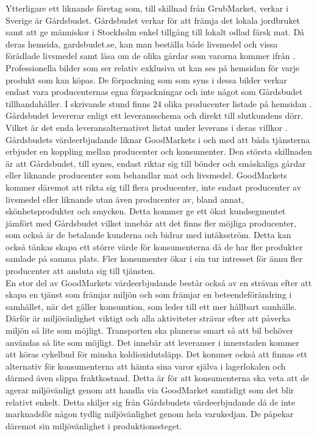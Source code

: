 \documentclass[10pt,a4paper,oneside]{article}
\begin{document}
Ytterligare ett liknande företag som, till skillnad från GrubMarket, verkar i Sverige är Gårdsbudet. Gårdsbudet verkar för att främja det lokala jordbruket samt att ge människor i Stockholm enkel tillgång till lokalt odlad färsk mat. Då deras hemsida, gardsbudet.se, kan man beställa både livsmedel och vissa förädlade livsmedel samt läsa om de olika gårdar som varorna kommer ifrån \cite{Gårdsbudet3}. Professionella bilder som ser relativ exklusiva ut kan ses på hemsidan för varje produkt som kan köpas. De förpackning som som syns i dessa bilder verkar endast vara producenternas egna förpackningar och inte något som Gårdsbudet tillhandahåller. I skrivande stund finns 24 olika producenter listade på hemsidan \cite{Gårdsbudet2}. Gårdsbudet levererar enligt ett leveransschema och direkt till slutkundens dörr. Vilket är det enda leveransalternativet listat under leverans i deras villkor \citep{Gårdsbudet1}. Gårdsbudets värdeerbjudande liknar GoodMarkets i och med att båda tjänsterna erbjuder en koppling mellan producenter och konsumenter. Den största skillnaden är att Gårdsbudet, till synes, endast riktar sig till bönder och småskaliga gårdar eller liknande producenter som behandlar mat och livsmedel. GoodMarkets kommer däremot att rikta sig till flera producenter, inte endast producenter av livsmedel eller liknande utan även producenter av, bland annat,  skönhetsprodukter och smycken. Detta kommer ge ett ökat kundsegmentet jämfört med Gårdsbudet vilket innebär att det finns fler möjliga producenter, som också är de betalande kunderna och bidrar med intäksström. Detta kan också tänkas skapa ett större värde för konsumenterna då de har fler produkter samlade på samma plats. Fler konsumenter ökar i sin tur intresset för ännu fler producenter att ansluta sig till tjänsten. \\

En stor del av GoodMarkets värdeerbjudande består också av en strävan efter att skapa en tjänst som främjar miljön och som främjar en beteendeförändring i samhället, när det gäller konsumtion,  som leder till ett mer hållbart samhälle. Därför är miljövänlighet viktigt och alla aktiviteter strävar efter att påverka miljön så lite som möjligt. Transporten ska planeras smart så att bil behöver användas så lite som möjligt. Det innebär att leveranser i innerstaden kommer att köras cykelbud för minska koldioxidutsläpp. Det kommer också att finnas ett alternativ för konsumenterna att hämta sina varor själva i lagerlokalen och därmed även slippa fraktkostnad. Detta är för att konsumenterna ska veta att de agerar miljövänligt genom att handla via GoodMarket samtidigt som det blir relativt enkelt. Detta skiljer sig från Gårdsbudets värdeerbjudande då de inte marknadsför någon tydlig miljövänlighet genom hela varukedjan. De påpekar däremot sin miljövänlighet i produktionssteget. 
\end{document}

